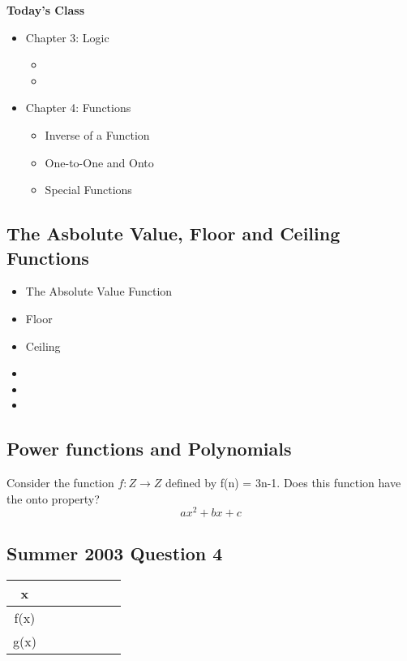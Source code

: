 \documentclass{article}
\begin{document}
\textbf{Today's Class}
\begin{itemize}
\item Chapter 3: Logic
\begin{itemize}
\item
\item
\end{itemize}
\item Chapter 4: Functions
\begin{itemize}
\item Inverse of a Function
\item One-to-One and Onto
\item Special Functions
\end{itemize}
\end{itemize}
\newpage


\subsection*{The Asbolute Value, Floor and Ceiling Functions}
\begin{itemize}
\item The Absolute Value Function
\item Floor
\item Ceiling
\end{itemize}



\begin{itemize}
\item
\item
\item
\end{itemize}

\subsection*{Power functions and Polynomials}


Consider the function $f: Z \rightarrow Z$ defined by f(n) = 3n-1. Does this function have the onto property?
\[ax^2 + bx + c\]
\subsection*{Summer 2003 Question 4}


\begin{center}
\begin{tabular}{ccccccc}
	x & & & & & & \\ \hline
	f(x) & & & & & & \\ \hline
	g(x) & & & & & & \\ \hline
\end{tabular}
\end{center}
\end{document}

